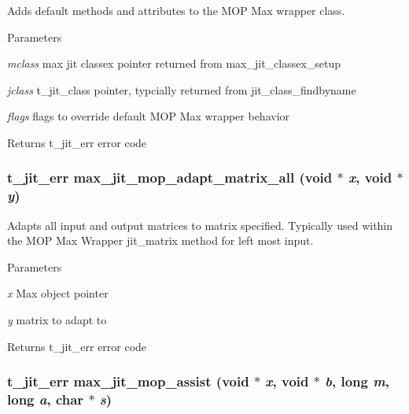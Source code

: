 Adds default methods and attributes to the MOP Max wrapper class. 
\begin{DoxyParams}{Parameters}
\item[{\em mclass}]max jit classex pointer returned from max\_\-jit\_\-classex\_\-setup \item[{\em jclass}]t\_\-jit\_\-class pointer, typcially returned from jit\_\-class\_\-findbyname \item[{\em flags}]flags to override default MOP Max wrapper behavior\end{DoxyParams}
\begin{DoxyReturn}{Returns}
t\_\-jit\_\-err error code 
\end{DoxyReturn}
\hypertarget{group__maxmopmod_ga896bfac67eb5e18c1c91fedebe8fe858}{
\subsubsection[{max\_\-jit\_\-mop\_\-adapt\_\-matrix\_\-all}]{\setlength{\rightskip}{0pt plus 5cm}t\_\-jit\_\-err max\_\-jit\_\-mop\_\-adapt\_\-matrix\_\-all (void $\ast$ {\em x}, \/  void $\ast$ {\em y})}}
\label{group__maxmopmod_ga896bfac67eb5e18c1c91fedebe8fe858}


Adapts all input and output matrices to matrix specified. Typically used within the MOP Max Wrapper jit\_\-matrix method for left most input.


\begin{DoxyParams}{Parameters}
\item[{\em x}]Max object pointer \item[{\em y}]matrix to adapt to\end{DoxyParams}
\begin{DoxyReturn}{Returns}
t\_\-jit\_\-err error code 
\end{DoxyReturn}
\hypertarget{group__maxmopmod_gaf8a46feb31b44f110ed1dee18338e52f}{
\subsubsection[{max\_\-jit\_\-mop\_\-assist}]{\setlength{\rightskip}{0pt plus 5cm}t\_\-jit\_\-err max\_\-jit\_\-mop\_\-assist (void $\ast$ {\em x}, \/  void $\ast$ {\em b}, \/  long {\em m}, \/  long {\em a}, \/  char $\ast$ {\em s})}}
\label{group__maxmopmod_gaf8a46feb31b44f110ed1dee18338e52f}


